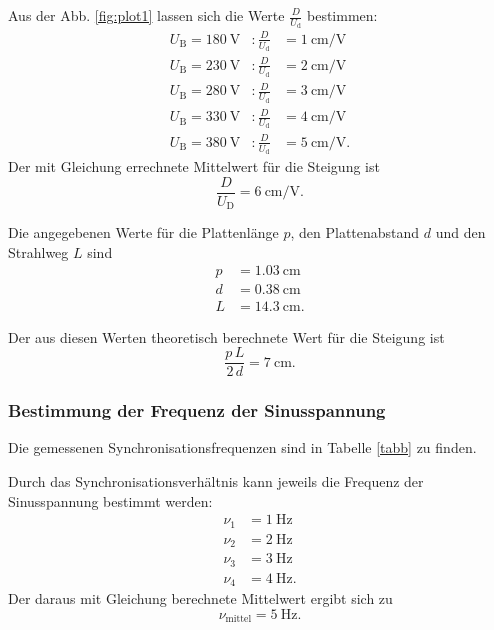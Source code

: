 \noindent Aus der Abb. \ref{fig:plot1} lassen sich die Werte 
$\frac{D}{U_\text{d}}$ bestimmen:
\begin{align*}
    U_\text{B} = \SI{180}{\volt} &: \frac{D}{U_\text{d}} &= \SI{1}{\centi\meter\per\volt} \\
    U_\text{B} = \SI{230}{\volt} &: \frac{D}{U_\text{d}} &= \SI{2}{\centi\meter\per\volt} \\
    U_\text{B} = \SI{280}{\volt} &: \frac{D}{U_\text{d}} &= \SI{3}{\centi\meter\per\volt} \\
    U_\text{B} = \SI{330}{\volt} &: \frac{D}{U_\text{d}} &= \SI{4}{\centi\meter\per\volt} \\
    U_\text{B} = \SI{380}{\volt} &: \frac{D}{U_\text{d}} &= \SI{5}{\centi\meter\per\volt}.
\end{align*}
Der mit Gleichung %
errechnete Mittelwert für die Steigung ist
\begin{equation*}
    \frac{D}{U_\text{D}} = \SI{6}{\centi\meter\per\volt}.
\end{equation*}


\noindent Die angegebenen Werte für die Plattenlänge $p$,
den Plattenabstand $d$ und den Strahlweg $L$ sind
\begin{align*}
    p &= \SI{1.03}{\centi\meter} \\
    d &= \SI{0.38}{\centi\meter} \\
    L &= \SI{14.3}{\centi\meter}.
\end{align*}

Der aus diesen Werten theoretisch berechnete Wert für die
Steigung ist
\begin{equation*}
    \frac{p \, L}{2 \, d} = \SI{7}{\centi\meter}.
\end{equation*}

\subsubsection{Bestimmung der Frequenz der Sinusspannung}
Die gemessenen Synchronisationsfrequenzen sind in Tabelle
\ref{tabb} zu finden. 


\noindent Durch das Synchronisationsverhältnis
kann jeweils die Frequenz der Sinusspannung bestimmt werden:
\begin{align*}
    \nu_1 &= \SI{1}{\hertz} \\
    \nu_2 &= \SI{2}{\hertz} \\
    \nu_3 &= \SI{3}{\hertz} \\
    \nu_4 &= \SI{4}{\hertz}.
\end{align*}
Der daraus mit Gleichung
berechnete Mittelwert ergibt sich zu
\begin{equation*}
    \nu_\text{mittel} = \SI{5}{\hertz}.
\end{equation*}


